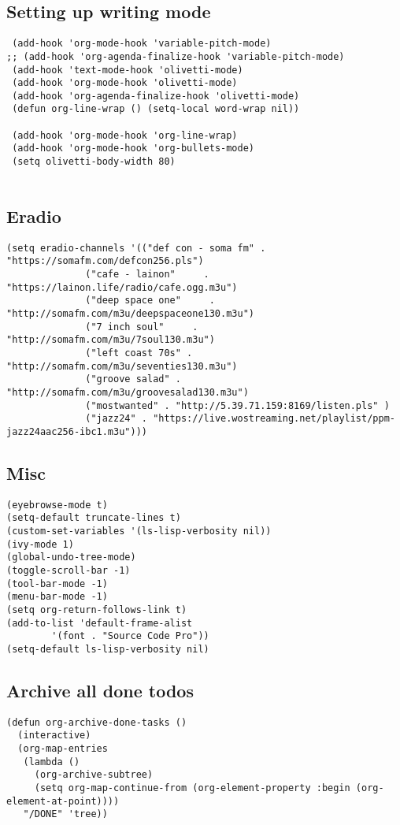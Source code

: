 \documentclass[11pt]{article}
\begin{document}
\subsection{Setting up writing mode}
\label{sec:orge6f32db}
\begin{verbatim}
 (add-hook 'org-mode-hook 'variable-pitch-mode)
;; (add-hook 'org-agenda-finalize-hook 'variable-pitch-mode)
 (add-hook 'text-mode-hook 'olivetti-mode)
 (add-hook 'org-mode-hook 'olivetti-mode)
 (add-hook 'org-agenda-finalize-hook 'olivetti-mode)
 (defun org-line-wrap () (setq-local word-wrap nil))

 (add-hook 'org-mode-hook 'org-line-wrap)
 (add-hook 'org-mode-hook 'org-bullets-mode)
 (setq olivetti-body-width 80)


\end{verbatim}
\subsection{Eradio}
\label{sec:org4ec981d}
\begin{verbatim}
(setq eradio-channels '(("def con - soma fm" . "https://somafm.com/defcon256.pls")
		      ("cafe - lainon"     . "https://lainon.life/radio/cafe.ogg.m3u")
		      ("deep space one"     . "http://somafm.com/m3u/deepspaceone130.m3u")
		      ("7 inch soul"     . "http://somafm.com/m3u/7soul130.m3u")
		      ("left coast 70s" . "http://somafm.com/m3u/seventies130.m3u")
		      ("groove salad" . "http://somafm.com/m3u/groovesalad130.m3u")
		      ("mostwanted" . "http://5.39.71.159:8169/listen.pls" )
		      ("jazz24" . "https://live.wostreaming.net/playlist/ppm-jazz24aac256-ibc1.m3u")))  
\end{verbatim}
\subsection{Misc}
\label{sec:orga8e0800}
\begin{verbatim}
(eyebrowse-mode t)
(setq-default truncate-lines t)
(custom-set-variables '(ls-lisp-verbosity nil))
(ivy-mode 1)
(global-undo-tree-mode)
(toggle-scroll-bar -1)
(tool-bar-mode -1)
(menu-bar-mode -1)
(setq org-return-follows-link t)
(add-to-list 'default-frame-alist
	    '(font . "Source Code Pro"))
(setq-default ls-lisp-verbosity nil)
\end{verbatim}
\subsection{Archive all done todos}
\label{sec:org4cad991}
\begin{verbatim}
(defun org-archive-done-tasks ()
  (interactive)
  (org-map-entries
   (lambda ()
     (org-archive-subtree)
     (setq org-map-continue-from (org-element-property :begin (org-element-at-point))))
   "/DONE" 'tree))
\end{verbatim}
\end{document}
